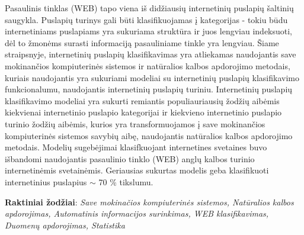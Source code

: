 
Pasaulinis tinklas (WEB) tapo viena iš didžiausių internetinių puslapių šaltinių saugykla. Puslapių turinys gali būti klasifikuojamas į kategorijas - tokiu būdu internetiniams puslapiams yra sukuriama struktūra ir juos lengviau indeksuoti, dėl to žmonėms surasti informaciją pasauliniame tinkle yra lengviau. Šiame straipsnyje, internetinių puslapių klasifikavimas yra atliekamas naudojantis save mokinančios kompiuterinės sistemos ir natūralios kalbos apdorojimo metodais, kuriais naudojantis yra sukuriami modeliai su internetinių puslapių klasifikavimo funkcionalumu, naudojantis internetinių puslapių turiniu. Internetinių puslapių klasifikavimo modeliai yra sukurti remiantis populiauriausių žodžių aibėmis kiekvienai internetinio puslapio kategorijai ir kiekvieno internetinio puslapio turinio žodžių aibėmis, kurios yra transformuojamos į save mokinančios kompiuterinės sistemos savybių aibę, naudojantis natūralios kalbos apdorojimo metodais. Modelių sugebėjimai klasifkuojant internetines svetaines buvo išbandomi naudojantis pasaulinio tinklo (WEB) anglų kalbos turinio internetinėmis svetainėmis. Geriausias sukurtas modelis geba klasifikuoti internetinius puslapius $\sim$ 70 \% tikslumu.

\bigskip
\textbf{Raktiniai žodžiai}: \textit{Save mokinačios kompiuterinės sistemos, Natūralios kalbos apdorojimas, Automatinis informacijos surinkimas, WEB klasifikavimas, Duomenų apdorojimas, Statistika}
